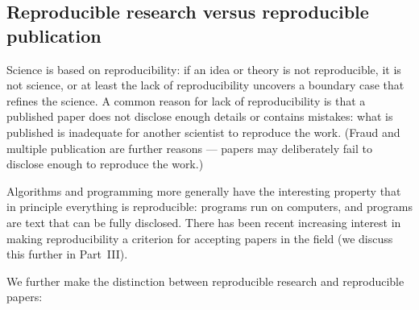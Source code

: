\documentclass[preprint,times]{elsarticle}
\begin{document}
\subsection{Reproducible research versus reproducible publication}
Science is based on reproducibility: if an idea or theory is not reproducible, it is not science, or at least the lack of reproducibility uncovers a boundary case that refines the science. A common reason for lack of reproducibility is that a published paper does not disclose enough details or contains mistakes: what is published is inadequate for another scientist to reproduce the work. (Fraud and multiple publication are further reasons --- papers may deliberately fail to disclose enough to reproduce the work.)

Algorithms and programming more generally have the interesting property that in principle everything is reproducible: programs run on computers, and programs are text that can be fully disclosed. There has been recent increasing interest in making reproducibility a criterion for accepting papers in the field (we discuss this further in Part~III).

We further make the distinction between reproducible research and reproducible papers:
\end{document}
